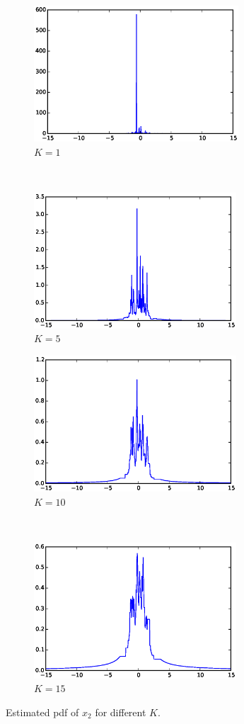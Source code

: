 \documentclass[a4paper,12pt]{article}
\begin{document}
\begin{figure}[h]
    \centering
    \begin{subfigure}[t]{0.5\textwidth} 
        \centering
        \includegraphics[height=2in]{figures/knn_x2_1.eps}
        \caption{$K=1$}
    \end{subfigure}%
    ~  %
    \begin{subfigure}[t]{0.5\textwidth}
        \centering
        \includegraphics[height=2in]{figures/knn_x2_5.eps}
        \caption{$K=5$}
    \end{subfigure}%

    \begin{subfigure}[t]{0.5\textwidth}
        \centering
        \includegraphics[height=2in]{figures/knn_x2_10.eps}
        \caption{$K=10$}
    \end{subfigure}%
    ~
    \begin{subfigure}[t]{0.5\textwidth}
        \centering
        \includegraphics[height=2in]{figures/knn_x2_15.eps}
        \caption{$K=15$}
    \end{subfigure}    
    \caption{Estimated pdf of $x_2$ for different $K$.}
\end{figure}
\end{document}
